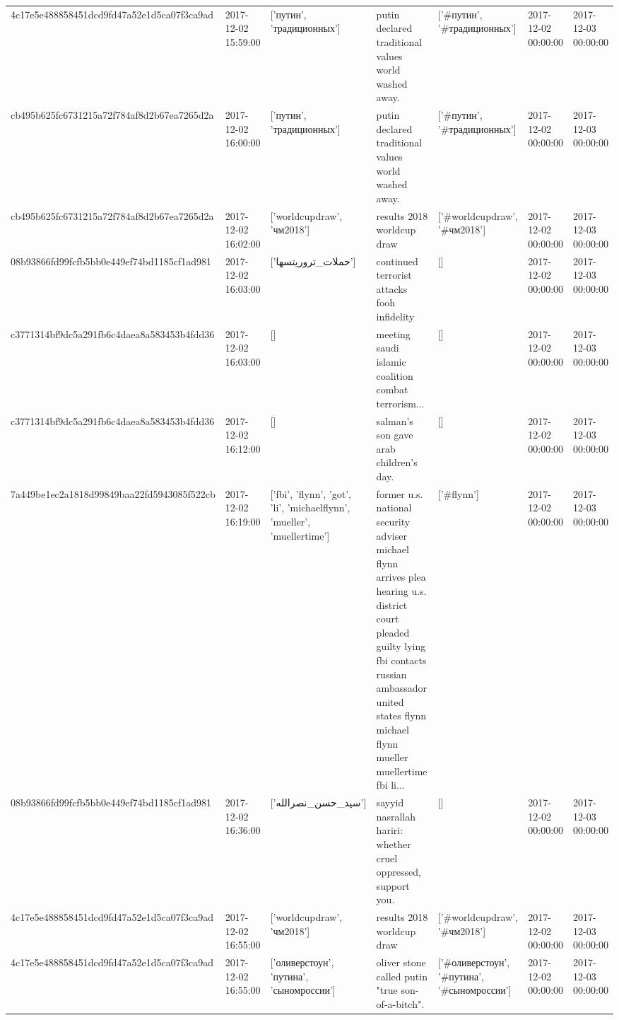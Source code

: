 \begin{tabular}{lllllll}
4c17e5e488858451dcd9fd47a52e1d5ca07f3ca9ad & 2017-12-02 15:59:00 & ['путин', 'традиционных'] & putin declared traditional values world washed away. & ['#путин', '#традиционных'] & 2017-12-02 00:00:00 & 2017-12-03 00:00:00 \\
cb495b625fc6731215a72f784af8d2b67ea7265d2a & 2017-12-02 16:00:00 & ['путин', 'традиционных'] & putin declared traditional values world washed away. & ['#путин', '#традиционных'] & 2017-12-02 00:00:00 & 2017-12-03 00:00:00 \\
cb495b625fc6731215a72f784af8d2b67ea7265d2a & 2017-12-02 16:02:00 & ['worldcupdraw', 'чм2018'] & results 2018 worldcup draw & ['#worldcupdraw', '#чм2018'] & 2017-12-02 00:00:00 & 2017-12-03 00:00:00 \\
08b93866fd99fcfb5bb0e449ef74bd1185cf1ad981 & 2017-12-02 16:03:00 & ['حملات_تروریتسها'] & continued terrorist attacks fooh infidelity & [] & 2017-12-02 00:00:00 & 2017-12-03 00:00:00 \\
c3771314bf9dc5a291fb6c4daea8a583453b4fdd36 & 2017-12-02 16:03:00 & [] & meeting saudi islamic coalition combat terrorism... & [] & 2017-12-02 00:00:00 & 2017-12-03 00:00:00 \\
c3771314bf9dc5a291fb6c4daea8a583453b4fdd36 & 2017-12-02 16:12:00 & [] & salman's son gave arab children's day. & [] & 2017-12-02 00:00:00 & 2017-12-03 00:00:00 \\
7a449be1ec2a1818d99849baa22fd5943085f522cb & 2017-12-02 16:19:00 & ['fbi', 'flynn', 'got', 'li', 'michaelflynn', 'mueller', 'muellertime'] & former u.s. national security adviser michael flynn arrives plea hearing u.s. district court pleaded guilty lying fbi contacts russian ambassador united states flynn michael flynn mueller muellertime fbi li... & ['#flynn'] & 2017-12-02 00:00:00 & 2017-12-03 00:00:00 \\
08b93866fd99fcfb5bb0e449ef74bd1185cf1ad981 & 2017-12-02 16:36:00 & ['سید_حسن_نصرالله'] & sayyid nasrallah hariri: whether cruel oppressed, support you. & [] & 2017-12-02 00:00:00 & 2017-12-03 00:00:00 \\
4c17e5e488858451dcd9fd47a52e1d5ca07f3ca9ad & 2017-12-02 16:55:00 & ['worldcupdraw', 'чм2018'] & results 2018 worldcup draw & ['#worldcupdraw', '#чм2018'] & 2017-12-02 00:00:00 & 2017-12-03 00:00:00 \\
4c17e5e488858451dcd9fd47a52e1d5ca07f3ca9ad & 2017-12-02 16:55:00 & ['оливерстоун', 'путина', 'сыномроссии'] & oliver stone called putin "true son-of-a-bitch". & ['#оливерстоун', '#путина', '#сыномроссии'] & 2017-12-02 00:00:00 & 2017-12-03 00:00:00 \\

\end{tabular}
